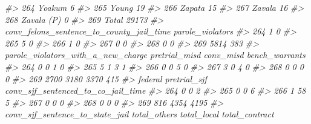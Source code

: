 \documentclass[
]{krantz}
\makeatletter
\newenvironment{Shaded}{\begin{snugshade}}{\end{snugshade}}
\newcommand{\CommentTok}[1]{\textcolor[rgb]{0.37,0.37,0.37}{\textit{#1}}}
\newenvironment{kframe}{%
\medskip{}
\setlength{\fboxsep}{.8em}
 \def\at@end@of@kframe{}%
 \ifinner\ifhmode%
  \def\at@end@of@kframe{\end{minipage}}%
  \begin{minipage}{\columnwidth}%
 \fi\fi%
 \def\FrameCommand##1{\hskip\@totalleftmargin \hskip-\fboxsep
 \colorbox{shadecolor}{##1}\hskip-\fboxsep
     \hskip-\linewidth \hskip-\@totalleftmargin \hskip\columnwidth}%
 \MakeFramed {\advance\hsize-\width
   \@totalleftmargin\z@ \linewidth\hsize
   \@setminipage}}%
 {\par\unskip\endMakeFramed%
 \at@end@of@kframe}
\renewenvironment{Shaded}{\begin{kframe}}{\end{kframe}}
\makeatother
\begin{document}
\begin{Shaded}
\begin{Highlighting}[]
\CommentTok{\#\textgreater{} 264     Yoakum                           6}
\CommentTok{\#\textgreater{} 265      Young                          19}
\CommentTok{\#\textgreater{} 266     Zapata                          15}
\CommentTok{\#\textgreater{} 267     Zavala                          16}
\CommentTok{\#\textgreater{} 268 Zavala (P)                           0}
\CommentTok{\#\textgreater{} 269                      Total       29173}
\CommentTok{\#\textgreater{}     conv\_felons\_sentence\_to\_county\_jail\_time parole\_violators}
\CommentTok{\#\textgreater{} 264                                        1                0}
\CommentTok{\#\textgreater{} 265                                        5                0}
\CommentTok{\#\textgreater{} 266                                        1                0}
\CommentTok{\#\textgreater{} 267                                        0                0}
\CommentTok{\#\textgreater{} 268                                        0                0}
\CommentTok{\#\textgreater{} 269                                     5814              383}
\CommentTok{\#\textgreater{}     parole\_violators\_with\_a\_new\_charge pretrial\_misd conv\_misd bench\_warrants}
\CommentTok{\#\textgreater{} 264                                  0             0         1              0}
\CommentTok{\#\textgreater{} 265                                  5             1         3              1}
\CommentTok{\#\textgreater{} 266                                  0             0         5              0}
\CommentTok{\#\textgreater{} 267                                  3             0         4              0}
\CommentTok{\#\textgreater{} 268                                  0             0         0              0}
\CommentTok{\#\textgreater{} 269                               2700          3180      3370            415}
\CommentTok{\#\textgreater{}     federal pretrial\_sjf conv\_sjf\_sentenced\_to\_co\_jail\_time}
\CommentTok{\#\textgreater{} 264       0            0                                  2}
\CommentTok{\#\textgreater{} 265       0            0                                  6}
\CommentTok{\#\textgreater{} 266       1           58                                  5}
\CommentTok{\#\textgreater{} 267       0            0                                  0}
\CommentTok{\#\textgreater{} 268       0            0                                  0}
\CommentTok{\#\textgreater{} 269     816         4354                               4195}
\CommentTok{\#\textgreater{}     conv\_sjf\_sentence\_to\_state\_jail total\_others total\_local total\_contract}

\end{Highlighting}
\end{Shaded}
\end{document}
